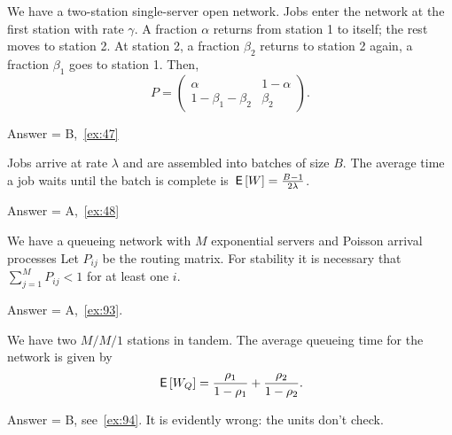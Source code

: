\begin{exercise}[201904]
  We have a two-station single-server open network.
  Jobs enter the network at the first station with rate $\gamma$.
  A fraction $\alpha$ returns from station 1 to itself; the rest moves to station 2.
  At station 2, a fraction $\beta_2$ returns to station 2 again, a fraction $\beta_1$ goes to station 1.
  Then,
  \begin{equation*}
    P = 
    \begin{pmatrix}
      \alpha & 1- \alpha \\
      1- \beta_1-\beta_2 & \beta_2
    \end{pmatrix}.
  \end{equation*}
\begin{solution}  Answer = B,~\cref{ex:47}
\end{solution}
\end{exercise}

\begin{exercise}[201904]
  Jobs arrive at rate $\lambda$ and are assembled into batches of size $B$.
  The average time a job waits until the batch is complete is $\,\mathsf{E}\left[W\right] = \frac{B-1}{2\lambda}$.
\begin{solution}Answer = A,~\cref{ex:48}
\end{solution}
\end{exercise}


\begin{exercise}[201907]
  We have a queueing network with $M$ exponential servers and Poisson arrival processes
  Let $P_{ij}$ be the routing matrix.
  For stability it is necessary that $\sum_{j=1}^M P_{i j} <1$  for at least one $i$. 
\begin{solution}
Answer = A,~\cref{ex:93}.
\end{solution}
\end{exercise}



\begin{exercise}[201907]
We have two $M/M/1$ stations in tandem.  The average queueing time for the network  is given by
\begin{equation}
\,\mathsf{E}\left[W_Q\right]  = \frac{\rho_1}{1-\rho_1} + \frac{\rho_2}{1-\rho_2}.
\end{equation}
\begin{solution}
Answer = B, see~\cref{ex:94}. It is evidently wrong: the units don't check.
\end{solution}
\end{exercise}



